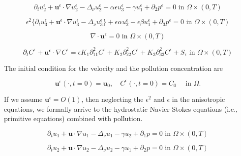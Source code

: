 \documentclass[11pt]{article}
\begin{document}
    \begin{equation} \label{ANSC2}
    \partial_t u_2^\epsilon + \mathbf{u}^\epsilon \cdot \nabla u_2^\epsilon -\Delta_\nu u_2^\epsilon + \alpha \epsilon u^\epsilon_3 - \gamma u_1^\epsilon + \partial_2 p^\epsilon = 0 \text{ in } \Omega \times (0,T)
    \end{equation}
    
    \begin{equation} \label{ANSC3}
    \epsilon^2 \{  \partial_t u_3^\epsilon + \mathbf{u}^\epsilon \cdot \nabla u_3^\epsilon -\Delta_\nu u_3^{\epsilon} \} + \epsilon \alpha u^\epsilon_2 - \epsilon \beta u_1^\epsilon + \partial_3 p^\epsilon = 0 \text{ in } \Omega \times (0,T)
    \end{equation}
    
    \begin{equation} \label{ANSC4}
    \nabla \cdot \mathbf{u}^\epsilon= 0 \text{ in } \Omega \times (0,T)
    \end{equation}
    
    \begin{equation} \label{ANSC5}
    \partial_t C^\epsilon + \mathbf{u^\epsilon} \cdot \nabla C^\epsilon = \epsilon K_1 \partial_{11} ^ 2 C^\epsilon + K_2 \partial_{22} ^ 2 C^\epsilon + K_3 \partial_{33} ^ 2 C^\epsilon + S_\epsilon \text{ in } \Omega \times (0,T)
    \end{equation}

The initial condition for the velocity and the pollution concentration are
    
    \begin{equation} \label{ANSC7}
    \mathbf{u}^\epsilon (\cdot, t = 0) = \mathbf{u}_0, \quad C^\epsilon (\cdot, t=0) = C_0  \quad \text{ in } \Omega.
    \end{equation}
  
    
If we assume $\mathbf{u}^\epsilon = O(1)$, then neglecting the $\epsilon^2$ and $\epsilon$ in the anisotropic equations, we formally arrive to the hydrostatic Navier-Stokes equations (i.e., primitive equations) combined with pollution.

    \begin{equation} \label{HNSC1}    
    \partial_t u_1 + \mathbf{u} \cdot \nabla u_1 - \Delta_\nu u_1 -\gamma u_2 + \partial_1 p = 0 \text{ in } \Omega \times (0,T)
    \end{equation}
    
    \begin{equation} \label{HNSC2}   
    \partial_t u_2 + \mathbf{u} \cdot \nabla u_2 - \Delta_\nu u_2 -\gamma u_1 + \partial_2 p = 0 \text{ in } \Omega \times (0,T)
    \end{equation}
    
\end{document}
